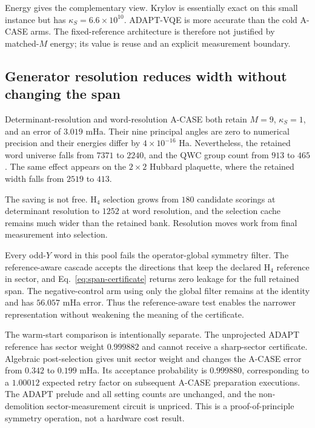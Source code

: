 \documentclass[aps,pra,reprint,superscriptaddress,nofootinbib,floatfix]{revtex4-2}
\begin{document}
Energy gives the complementary view.  Krylov is essentially exact on this
small instance but has \(\kappa_S=6.6\times10^{10}\).  ADAPT-VQE is more
accurate than the cold A-CASE arms.  The fixed-reference architecture is
therefore not justified by matched-\(M\) energy; its value is reuse and an
explicit measurement boundary.

\subsection{Generator resolution reduces width without changing the span}
\label{sec:results-resolution}

Determinant-resolution and word-resolution A-CASE both retain \(M=9\),
\(\kappa_S=1\), and an error of \(3.019\) mHa.  Their nine principal angles
are zero to numerical precision and their energies differ by
\(4\times10^{-16}\) Ha.  Nevertheless, the retained word universe falls from
\(7371\) to \(2240\), and the QWC group count from \(913\) to \(465\).
The same effect appears on the \(2\times2\) Hubbard plaquette, where the
retained width falls from \(2519\) to \(413\).

The saving is not free.  H$_4$ selection grows from \(180\) candidate
scorings at determinant resolution to \(1252\) at word resolution, and the
selection cache remains much wider than the retained bank.  Resolution moves
work from final measurement into selection.

Every odd-\(Y\) word in this pool fails the operator-global symmetry filter.
The reference-aware cascade accepts the directions that keep the declared H$_4$
reference in sector, and Eq.~\eqref{eq:span-certificate} returns zero leakage
for the full retained span.  The negative-control arm using only the global
filter remains at the identity and has \(56.057\) mHa error.  Thus the
reference-aware test enables the narrower representation without weakening
the meaning of the certificate.

The warm-start comparison is intentionally separate.  The unprojected ADAPT
reference has sector weight \(0.999882\) and cannot receive a sharp-sector
certificate.  Algebraic post-selection gives unit sector weight and changes
the A-CASE error from \(0.342\) to \(0.199\) mHa.  Its acceptance probability
is \(0.999880\), corresponding to a \(1.00012\) expected retry factor on
subsequent A-CASE preparation executions.  The ADAPT prelude and all setting
counts are unchanged, and the non-demolition sector-measurement circuit is
unpriced.  This is a proof-of-principle symmetry operation, not a hardware
cost result.
\end{document}
